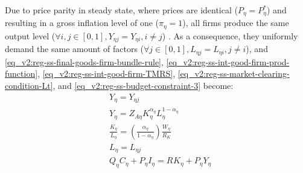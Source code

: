 \documentclass[../thesis.tex]{subfiles}
\begin{document}
\begin{comment}
	Substitute \ref{eq_v2:reg-ss-nominal-wage} in \ref{eq_v2:reg-ss-int-good-firm-MC-2} for the technology level of region 2, $Z_{A2}$:
	\begin{align}
		\Lambda_{\eta} &= \frac{1}{Z_{A\eta}} \left( \frac{R_K}{{\alpha_{\eta}}} \right)^{{\alpha_{\eta}}} \left( \frac{W}{1-\alpha_{\eta}} \right)^{1-\alpha_{\eta}} \implies \tag{\ref{eq_v2:reg-ss-int-good-firm-MC-2}} \\
		Z_{A2} &= \frac{1}{\Lambda_{}} \left( \frac{R_K}{{\alpha_{\eta}}} \right)^{{\alpha_{\eta}}} \left( \frac{W}{1-\alpha_{\eta}} \right)^{1-\alpha_{\eta}} \label{eq_v2:reg-ss-za2}
	\end{align}
\end{comment}

Due to price parity in steady state, where prices are identical ($P_{\eta} = P_{\eta}^{\ast}$) and resulting in a gross inflation level of one ($\pi_{\eta} = 1$), all firms produce the same output level ($\forall i, j \in [0,1], Y_{\eta j} = Y_{\eta i}, i \neq j$) \cite[Lecture 13, p.12]{solis-garcia_ucb_2022}. As a consequence, they uniformly demand the same amount of factors ($\forall j \in [0,1], L_{\eta j} = L_{\eta i}, j \neq i$), and \ref{eq_v2:reg-ss-final-goods-firm-bundle-rule}, \ref{eq_v2:reg-ss-int-good-firm-prod-function}, \ref{eq_v2:reg-ss-int-good-firm-TMRS}, \ref{eq_v2:reg-ss-market-clearing-condition-Lt}, and \ref{eq_v2:reg-ss-budget-constraint-3} become:
\begin{align}
	& Y_{\eta} = Y_{\eta j} \label{eq_v2:reg-ss-final-goods-firm-bundle-rule-2} \\
	& Y_{\eta} = Z_{A\eta} K_{\eta}^{\alpha_{\eta}} L_{\eta}^{1-{\alpha_{\eta}}} \label{eq_v2:reg-ss-int-good-firm-production-function-2} \\
	& \frac{K_{\eta}}{L_{\eta}} = \left( \frac{{\alpha_{\eta}}}{1-\alpha_{\eta}} \right) \frac{W_{\eta}}{R_{K}} \label{eq_v2:reg-ss-int-good-firm-TMRS-2} \\
	& L_{\eta} = L_{\eta j} \label{eq_v2:reg-ss-market-clearing-condition-Lt-2} \\
	& Q_{\eta} C_{\eta} + P_{\eta} I_{\eta} = R_{} K_{\eta} + P_{\eta} Y_{\eta} \label{eq_v2:reg-ss-budget-constraint-4}
\end{align}

\end{document}
